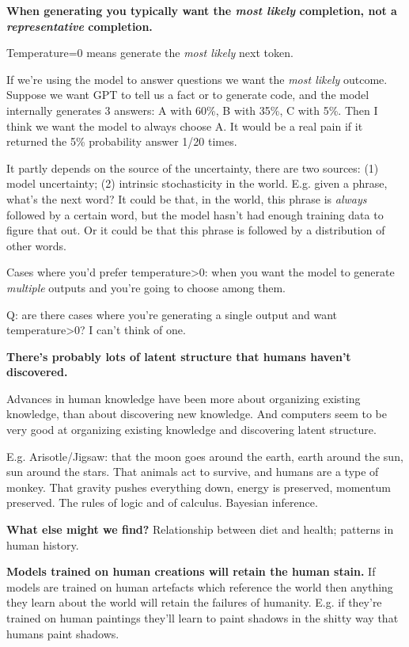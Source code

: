 \documentclass[
  11pt,
  letterpaper,
  DIV=11,
  numbers=noendperiod,
  oneside]{scrartcl}
\begin{document}
\textbf{When generating you typically want the \emph{most likely}
completion, not a \emph{representative} completion.}

Temperature=0 means generate the \emph{most likely} next token.

If we're using the model to answer questions we want the \emph{most
likely} outcome. Suppose we want GPT to tell us a fact or to generate
code, and the model internally generates 3 answers: A with 60\%, B with
35\%, C with 5\%. Then I think we want the model to always choose A. It
would be a real pain if it returned the 5\% probability answer 1/20
times.

It partly depends on the source of the uncertainty, there are two
sources: (1) model uncertainty; (2) intrinsic stochasticity in the
world. E.g. given a phrase, what's the next word? It could be that, in
the world, this phrase is \emph{always} followed by a certain word, but
the model hasn't had enough training data to figure that out. Or it
could be that this phrase is followed by a distribution of other words.

Cases where you'd prefer temperature\textgreater0: when you want the
model to generate \emph{multiple} outputs and you're going to choose
among them.

Q: are there cases where you're generating a single output and want
temperature\textgreater0? I can't think of one.

\textbf{There's probably lots of latent structure that humans haven't
discovered.}

Advances in human knowledge have been more about organizing existing
knowledge, than about discovering new knowledge. And computers seem to
be very good at organizing existing knowledge and discovering latent
structure.

E.g. Arisotle/Jigsaw: that the moon goes around the earth, earth around
the sun, sun around the stars. That animals act to survive, and humans
are a type of monkey. That gravity pushes everything down, energy is
preserved, momentum preserved. The rules of logic and of calculus.
Bayesian inference.

\textbf{What else might we find?} Relationship between diet and health;
patterns in human history.

\textbf{Models trained on human creations will retain the human stain.}
If models are trained on human artefacts which reference the world then
anything they learn about the world will retain the failures of
humanity. E.g. if they're trained on human paintings they'll learn to
paint shadows in the shitty way that humans paint shadows.
\end{document}

